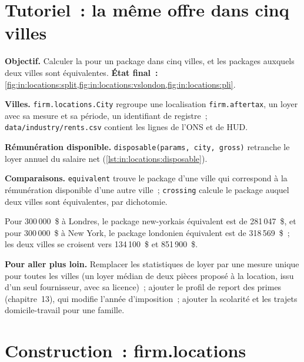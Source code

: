 \section{Tutoriel~: la même offre dans cinq villes}\label{tut:in:locations:tut}

\begin{tutorial}
\textbf{Objectif.} Calculer la  pour un package dans cinq villes, et les packages auxquels deux villes
sont équivalentes.
\textbf{État final~:} \cref{fig:in:locations:split,fig:in:locations:vslondon,fig:in:locations:pli}.
\begin{tutsteps}
\item \textbf{Villes.} \texttt{firm.locations.City} regroupe une localisation \texttt{firm.aftertax}, un loyer avec sa
mesure et sa période, un identifiant de registre~; \texttt{data/industry/rents.csv} contient les lignes de l'ONS et de HUD.
\item \textbf{Rémunération disponible.} \texttt{disposable(params, city, gross)} retranche le loyer annuel du salaire net
(\cref{lst:in:locations:disposable}).
\label{lst:in:locations:disposable}
\item \textbf{Comparaisons.} \texttt{equivalent} trouve le package d'une ville qui correspond à la rémunération disponible
d'une autre ville~; \texttt{crossing} calcule le package auquel deux villes sont équivalentes, par dichotomie.
\end{tutsteps}
\end{tutorial}

Pour 300\,000~\$ à Londres, le package new-yorkais équivalent est de 281\,047~\$, et pour 300\,000~\$ à New York, le
package londonien équivalent est de 318\,569~\$~; les deux villes se croisent vers 134\,100~\$ et 851\,900~\$.

\textbf{Pour aller plus loin.} Remplacer les statistiques de loyer par une mesure unique pour toutes les villes (un loyer médian de deux pièces
proposé à la location, issu d'un seul fournisseur, avec sa licence)~; ajouter le profil de report des primes (chapitre~13), qui modifie l'année d'imposition~;
ajouter la scolarité et les trajets domicile-travail pour une famille.

\section{Construction~: firm.locations}\label{bld:in:locations:locations}

